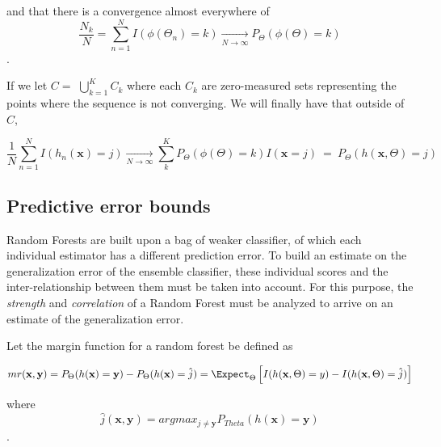 and that there is a convergence almost everywhere of $$ \frac{N_k}{N} = \sum_{n=1}^N  I(\phi(\Theta_n) = k)  \xrightarrow[N \to \infty]{}   P_{\Theta}(\phi(\Theta)= k)$$. 

If we let $C = $ $\bigcup\limits_{k=1}^{K} C_{k}$ where each $C_k$ are zero-measured sets representing the points where the sequence is not converging. We will finally have that  outside of $C$, 

$$ \frac{1}{N} \sum_{n=1}^N I(h_n(\textbf{x}) = j) \xrightarrow[N \to \infty]{} \sum_k^K    P_{\Theta}(\phi(\Theta)= k) I(\textbf{x} =j ) \ = \ P_{\Theta}(h(\textbf{x}, \Theta) = j)  $$ 




\subsection{Predictive error bounds}

Random Forests are built upon a bag of weaker classifier, of which each individual estimator has a different prediction error. To build an estimate on the generalization error of the ensemble classifier, these individual scores and the inter-relationship between them must be taken into account. For this purpose, the \textit{strength} and \textit{correlation} of a Random Forest must be analyzed to arrive on an estimate of the generalization error.




Let the margin function for a random forest be defined as

\begin{equation}\label{eq:rf-marginFunRf}
mr(\textbf{x},\textbf{y}) =  P_{\Theta}(h(\textbf{x}) = \textbf{y}) - P_{\Theta}(h(\textbf{x}) = \hat{j}) 
\\ 
= \Expect_{\Theta} \left[  I(h(\textbf{x},\Theta ) = y ) - I( h( \textbf{x},\Theta ) = \hat{j} )  \right]

\end{equation} 

where 
$$\hat{j}(\textbf{x},\textbf{y}) = arg max_{j\neq \textbf{y}} P_{Theta}(h(\textbf{x}) = \textbf{y})$$.
 

